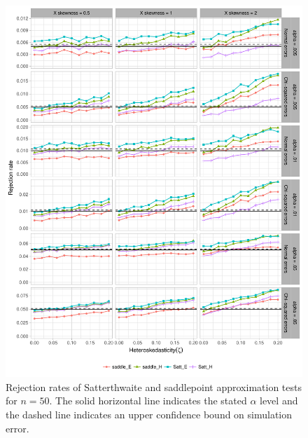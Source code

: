 \documentclass[12pt]{article}\usepackage[]{graphicx}\usepackage[]{color}
\newenvironment{knitrout}{}{} %
\begin{document}
\begin{knitrout}
\color{fgcolor}\begin{figure}[p]

{\centering \includegraphics[width=\linewidth]{HC_fig/Satterthwaite_size-1} 

}

\caption[Rejection rates of Satterthwaite and saddlepoint approximation tests for $n = 50$]{Rejection rates of Satterthwaite and saddlepoint approximation tests for $n = 50$. The solid horizontal line indicates the stated $\alpha$ level and the dashed line indicates an upper confidence bound on simulation error.}\label{fig:Satterthwaite_size}
\end{figure}


\end{knitrout}
\end{document}
